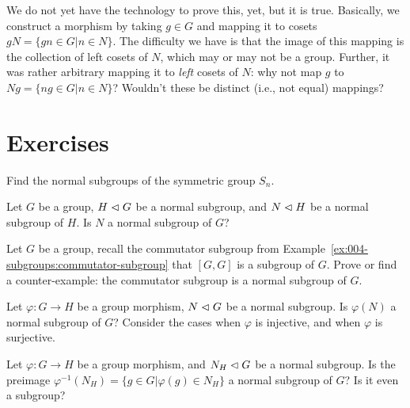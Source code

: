 \begin{remark}
We do not yet have the technology to prove this, yet, but it is true.
Basically, we construct a morphism by taking $g\in G$ and mapping it to
cosets $gN=\{gn\in G|n\in N\}$. The difficulty we have is that the image
of this mapping is the collection of left cosets of $N$, which may or
may not be a group. Further, it was rather arbitrary mapping it to
\emph{left} cosets of $N$: why not map $g$ to $Ng=\{ng\in G|n\in N\}$?
Wouldn't these be distinct (i.e., not equal) mappings?
\end{remark}

\section{Exercises}

\begin{exercise}
Find the normal subgroups of the symmetric group $S_{n}$.
\end{exercise}

\begin{exercise}
Let $G$ be a group, $H\mathrel{\lhd} G$ be a normal subgroup, and
$N\mathrel{\lhd} H$ be a normal subgroup of $H$. Is $N$ a normal
subgroup of $G$?
\end{exercise}

\begin{exercise}
Let $G$ be a group, recall the commutator subgroup from Example~\ref{ex:004-subgroups:commutator-subgroup}
that $[G,G]$ is a subgroup of $G$. Prove or find a counter-example: the
commutator subgroup is a normal subgroup of $G$.
\end{exercise}

\begin{exercise}
Let $\varphi\colon G\to H$ be a group morphism, $N\mathrel{\lhd} G$ be
a normal subgroup. Is $\varphi(N)$ a normal subgroup of $G$? Consider
the cases when $\varphi$ is injective, and when $\varphi$ is surjective.
\end{exercise}

\begin{exercise}
Let $\varphi\colon G\to H$ be a group morphism, and
$N_{H}\mathrel{\lhd} G$ be a normal subgroup. Is the preimage
$\varphi^{-1}(N_{H}) = \{g\in G|\varphi(g)\in N_{H}\}$ a normal subgroup
of $G$? Is it even a subgroup?
\end{exercise}

